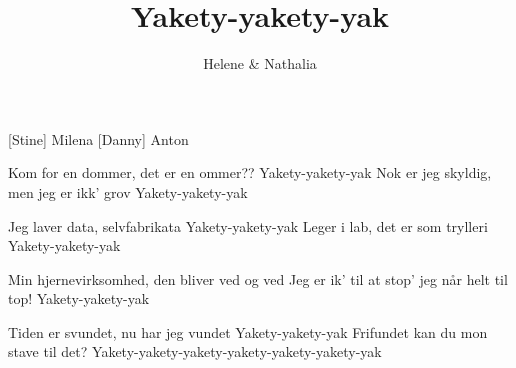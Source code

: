 \documentclass[a4paper,11pt]{article}
\title{Yakety-yakety-yak}
\author{Helene \& Nathalia}
\begin{document}
\maketitle

\begin{roles}
  [Stine] Milena
  [Danny] Anton
\end{roles}

\begin{center}
\end{center}

\begin{song}
Kom for en dommer, det er en ommer??
Yakety-yakety-yak
Nok er jeg skyldig, men jeg er ikk’ grov
Yakety-yakety-yak


Jeg laver data, selvfabrikata
Yakety-yakety-yak
Leger i lab, det er som trylleri
Yakety-yakety-yak


Min hjernevirksomhed, den bliver ved og ved
Jeg er ik’ til at stop’ jeg når helt til top!
Yakety-yakety-yak


Tiden er svundet, nu har jeg vundet
Yakety-yakety-yak
Frifundet kan du mon stave til det?
Yakety-yakety-yakety-yakety-yakety-yakety-yak


\end{song}
\end{document}
